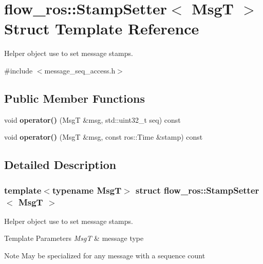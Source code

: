 \hypertarget{structflow__ros_1_1_stamp_setter}{}\section{flow\+\_\+ros\+:\+:Stamp\+Setter$<$ MsgT $>$ Struct Template Reference}
\label{structflow__ros_1_1_stamp_setter}


Helper object use to set message stamps.  




{\ttfamily \#include $<$message\+\_\+seq\+\_\+access.\+h$>$}

\subsection*{Public Member Functions}
\begin{DoxyCompactItemize}
\item 
\mbox{\label{structflow__ros_1_1_stamp_setter_af507692487d1b9efe3c21c76a5351a6c}} 
void {\bfseries operator()} (MsgT \&msg, std\+::uint32\+\_\+t seq) const
\item 
\mbox{\label{structflow__ros_1_1_stamp_setter_a6cec19566ccce497e73240ef20db7fc1}} 
void {\bfseries operator()} (MsgT \&msg, const ros\+::\+Time \&stamp) const
\end{DoxyCompactItemize}


\subsection{Detailed Description}
\subsubsection*{template$<$typename MsgT$>$\newline
struct flow\+\_\+ros\+::\+Stamp\+Setter$<$ Msg\+T $>$}

Helper object use to set message stamps. 


\begin{DoxyTemplParams}{Template Parameters}
{\em MsgT} & message type\\
\hline
\end{DoxyTemplParams}
\begin{DoxyNote}{Note}
May be specialized for any message with a sequence count
\end{DoxyNote}

